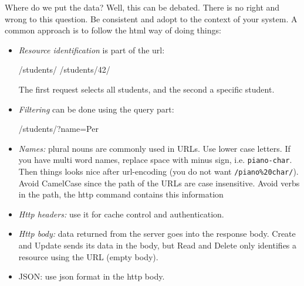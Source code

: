 Where do we put the data? Well, this can be debated. There is no right and wrong to this question. Be consistent and adopt to the context of your system. A common approach is to follow the html way of doing things:
\begin{itemize}
  \item \emph{Resource identification} is part of the url:
  \begin{Code}
  /students/
  /students/42/
  \end{Code}
  The first request selects all students, and the second a specific student.
  \item \emph{Filtering} can be done using the query part:
  \begin{Code}
  /students/?name=Per
  \end{Code}
  \item \emph{Names:}  plural nouns are commonly used in URLs. Use lower case letters. If you have multi word names, replace space with minus sign, i.e. \texttt{piano-char}. Then things looks nice after url-encoding (you do not want \texttt{/piano\%20char/}). Avoid CamelCase since the path of the URLs are case insensitive. Avoid verbs in the path, the http command contains this information
  \item \emph{Http headers:} use it for cache control and authentication.
  \item \emph{Http body:} data returned from the server goes into the response body. Create and Update sends its data in the body, but Read and Delete only identifies a resource using the URL (empty body).
  \item{JSON:} use json format in the http body.
\end{itemize}






